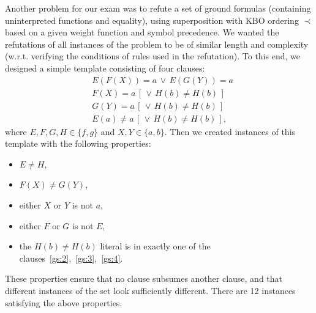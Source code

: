 Another problem for our exam was to refute a set of ground formulas
(containing uninterpreted functions and equality),
using superposition with KBO ordering $\prec$ based on
a given weight function and symbol precedence.
We wanted the refutations of all instances of the problem to be
of similar length and complexity (w.r.t. verifying the conditions
of rules used in the refutation). To this end, we designed a simple
template consisting of four clauses:
\begin{align}
  &E(F(X)) = a \,\lor\, E(G(Y)) = a \label{gs:1} \\
  &F(X) = a \,[\, \lor\, H(b) \not= H(b) \,] \label{gs:2} \\
  &G(Y) = a \,[\, \lor\, H(b) \not= H(b) \,] \label{gs:3} \\
  &E(a) \not= a \,[\, \lor\, H(b) \not= H(b) \,] \label{gs:4},
\end{align}
where $E, F, G, H \in \{f, g\}$ and $X, Y \in \{a, b\}$.
%
Then we created
instances of this template with the following properties:
\begin{itemize}
  \item $E \not = H$,
  \item $F(X) \not = G(Y)$,
  \item either $X$ or $Y$ is not $a$,
  \item either $F$ or $G$ is not $E$,
  \item the $H(b) \not = H(b)$ literal is in exactly one of the
    clauses~\eqref{gs:2},~\eqref{gs:3},~\eqref{gs:4}.
\end{itemize}
These properties ensure that no clause subsumes another clause,
and that different instances of the set look sufficiently different.
There are 12 instances satisfying the above properties.
%

